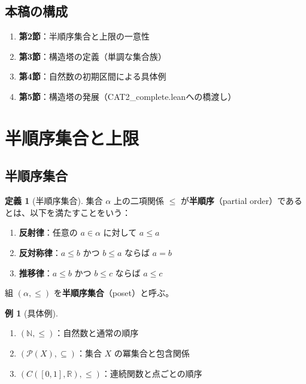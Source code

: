 \documentclass[a4paper,12pt]{ltjsarticle}
\theoremstyle{definition}
\newtheorem{definition}[theorem]{定義}
\newtheorem{example}[theorem]{例}
\newcommand{\N}{\mathbb{N}}
\newcommand{\R}{\mathbb{R}}
\begin{document}
\subsection{本稿の構成}

\begin{enumerate}
\item \textbf{第2節}：半順序集合と上限の一意性
\item \textbf{第3節}：構造塔の定義（単調な集合族）
\item \textbf{第4節}：自然数の初期区間による具体例
\item \textbf{第5節}：構造塔の発展（CAT2\_complete.leanへの橋渡し）
\end{enumerate}

\section{半順序集合と上限}

\subsection{半順序集合}

\begin{definition}[半順序集合]\label{def:poset}
集合 $\alpha$ 上の二項関係 $\leq$ が\textbf{半順序}（partial order）であるとは、以下を満たすことをいう：
\begin{enumerate}
\item \textbf{反射律}：任意の $a \in \alpha$ に対して $a \leq a$
\item \textbf{反対称律}：$a \leq b$ かつ $b \leq a$ ならば $a = b$
\item \textbf{推移律}：$a \leq b$ かつ $b \leq c$ ならば $a \leq c$
\end{enumerate}
組 $(\alpha, \leq)$ を\textbf{半順序集合}（poset）と呼ぶ。
\end{definition}

\begin{example}[具体例]
\begin{enumerate}
\item $(\N, \leq)$：自然数と通常の順序
\item $(\mathcal{P}(X), \subseteq)$：集合 $X$ の冪集合と包含関係
\item $(C([0,1], \R), \leq)$：連続関数と点ごとの順序
\end{enumerate}
\end{example}
\end{document}
